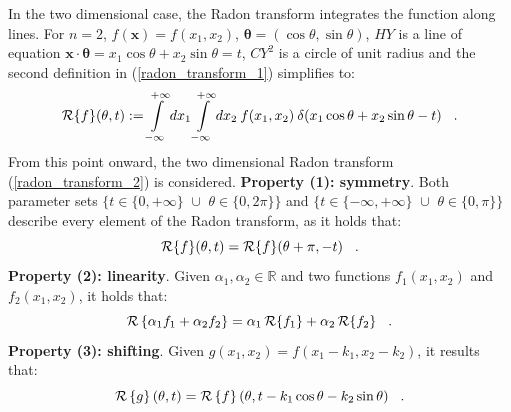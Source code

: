 {In the two dimensional case, the Radon transform integrates the function along lines.
For $n=2$, $f(\mathbf{x}) = f(x_{1},x_{2})$, $\boldsymbol{\theta} = (\cos\theta,\sin\theta)$, 
$HY$ is a line of equation $\mathbf{x}\cdot\boldsymbol{\theta} = x_{1}\cos\theta + x_{2}\sin\theta = t$,
$CY^{2}$ is a circle of unit radius and the second definition in (\ref{radon_transform_1}) simplifies to:
\begin{equation}
    \operatorname{\mathcal{R}}\{f\}(\theta,t) := \int\limits_{-\infty}^{+\infty}dx_{1}\int\limits_{-\infty}^{+\infty}dx_{2}\:f(x_{1},x_{2})\:
                             \delta(x_{1}\cos\theta + x_{2}\sin\theta - t) \hspace{0.3cm}. 
    \label{radon_transform_2}
\end{equation}
From this point onward, the two dimensional Radon transform (\ref{radon_transform_2}) is considered.
\newline\newline
{\bf Property (1): symmetry}. Both parameter sets $\{ t \in \{0,+\infty\} \,\,\cup\,\,\theta \in \{0,2\pi\}\}$ and 
$\{ t \in \{-\infty,+\infty\} \,\,\cup\,\,\theta \in \{0,\pi\}\}$ describe every element of the Radon transform, as it holds that:
\begin{equation}
  \operatorname{\mathcal{R}}\{f\}(\theta,t) = \operatorname{\mathcal{R}}\{f\}(\theta+\pi,-t) \hspace{0.3cm}.
  \label{radon_transform_3}
\end{equation}
\newline\newline
{\bf Property (2): linearity}. Given $\alpha_{1}, \alpha_{2} \in \mathbb{R}$ and two functions $f_{1}(x_{1},x_{2})$
and $f_{2}(x_{1},x_{2})$, it holds that:
\begin{equation}
  \operatorname{\mathcal{R}}\left\{ \alpha_{1}f_{1} + \alpha_{2}f_{2} \right\} = \alpha_{1}\operatorname{\mathcal{R}}\{f_{1}\} + \alpha_{2}\operatorname{\mathcal{R}}\{f_{2}\} \hspace{0.3cm}.
  \label{radon_transform_4}
\end{equation}
\newline\newline
{\bf Property (3): shifting}. Given $g(x_{1},x_{2}) = f(x_{1}-k_{1},x_{2}-k_{2})$, it results that:
\begin{equation}
  \operatorname{\mathcal{R}}\left\{g\right\}(\theta,t) = \operatorname{\mathcal{R}}\left\{f\right\}(\theta,t-k_{1}\cos\theta-k_{2}\sin\theta) \hspace{0.3cm}.
  \label{radon_transform_5}
\end{equation}
\newline\newline
}
